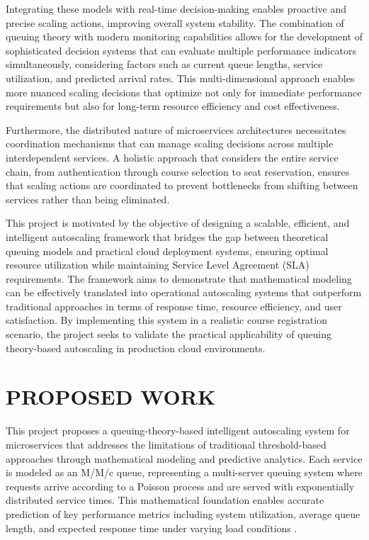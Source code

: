 Integrating these models with real-time decision-making enables proactive and precise scaling actions, improving overall system stability. The combination of queuing theory with modern monitoring capabilities allows for the development of sophisticated decision systems that can evaluate multiple performance indicators simultaneously, considering factors such as current queue lengths, service utilization, and predicted arrival rates. This multi-dimensional approach enables more nuanced scaling decisions that optimize not only for immediate performance requirements but also for long-term resource efficiency and cost effectiveness.

Furthermore, the distributed nature of microservices architectures necessitates coordination mechanisms that can manage scaling decisions across multiple interdependent services. A holistic approach that considers the entire service chain, from authentication through course selection to seat reservation, ensures that scaling actions are coordinated to prevent bottlenecks from shifting between services rather than being eliminated.

This project is motivated by the objective of designing a scalable, efficient, and intelligent autoscaling framework that bridges the gap between theoretical queuing models and practical cloud deployment systems, ensuring optimal resource utilization while maintaining Service Level Agreement (SLA) requirements. The framework aims to demonstrate that mathematical modeling can be effectively translated into operational autoscaling systems that outperform traditional approaches in terms of response time, resource efficiency, and user satisfaction. By implementing this system in a realistic course registration scenario, the project seeks to validate the practical applicability of queuing theory-based autoscaling in production cloud environments.

\section{PROPOSED WORK}

This project proposes a queuing-theory-based intelligent autoscaling system for microservices that addresses the limitations of traditional threshold-based approaches through mathematical modeling and predictive analytics. Each service is modeled as an M/M/c queue, representing a multi-server queuing system where requests arrive according to a Poisson process and are served with exponentially distributed service times. This mathematical foundation enables accurate prediction of key performance metrics including system utilization, average queue length, and expected response time under varying load conditions \cite{lai2025}.

